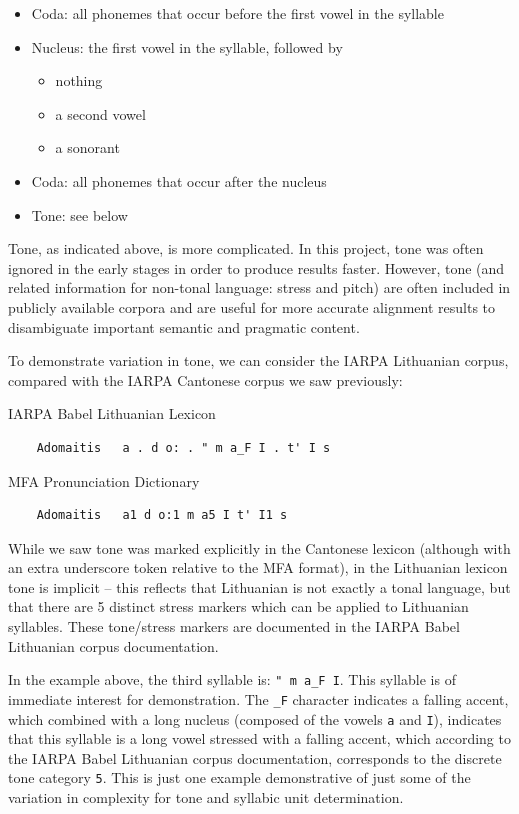 \documentclass[11pt]{article}
\begin{document}
\begin{itemize}
  \item Coda: all phonemes that occur before the first vowel in the syllable
  \item Nucleus: the first vowel in the syllable, followed by\begin{itemize}\item nothing\item a second vowel \item a sonorant\end{itemize}
  \item Coda: all phonemes that occur after the nucleus
  \item Tone: see below
\end{itemize}

Tone, as indicated above, is more complicated. In this project, tone was often ignored in the early stages in order to produce results faster. However, tone (and related information for non-tonal language: stress and pitch) are often included in publicly available corpora and are useful for more accurate alignment results to disambiguate important semantic and pragmatic content.

To demonstrate variation in tone, we can consider the IARPA Lithuanian corpus, compared with the IARPA Cantonese corpus we saw previously: \\

  \begin{singlespace}
    \noindent IARPA Babel Lithuanian Lexicon
    \begin{verbatim}
    Adomaitis   a . d o: . " m a_F I . t' I s
    \end{verbatim}
    MFA Pronunciation Dictionary
    \begin{verbatim}
    Adomaitis   a1 d o:1 m a5 I t' I1 s
    \end{verbatim}
  \end{singlespace}

  While we saw tone was marked explicitly in the Cantonese lexicon (although with an extra underscore token relative to the MFA format), in the Lithuanian lexicon tone is implicit -- this reflects that Lithuanian is not exactly a tonal language, but that there are 5 distinct stress markers which can be applied to Lithuanian syllables. These tone/stress markers are documented in the IARPA Babel Lithuanian corpus documentation.\cite{benowitz_iarpa_2019}

  In the example above, the third syllable is: \verb|" m a_F I|. This syllable is of immediate interest for demonstration. The \verb|_F| character indicates a falling accent, which combined with a long nucleus (composed of the vowels \verb|a| and \verb|I|), indicates that this syllable is a long vowel stressed with a falling accent, which according to the IARPA Babel Lithuanian corpus documentation, corresponds to the discrete tone category \verb|5|. This is just one example demonstrative of just some of the variation in complexity for tone and syllabic unit determination. 
\end{document}

